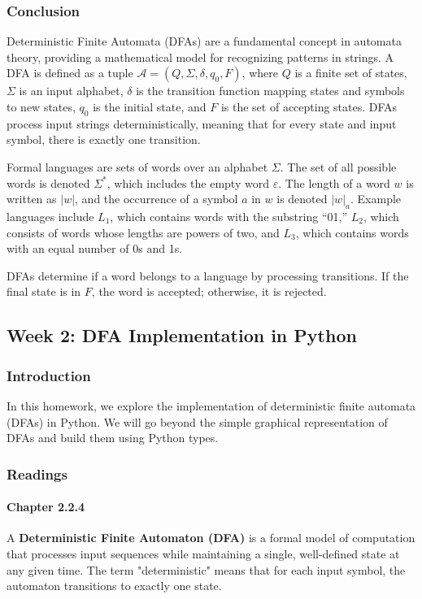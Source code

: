 \documentclass{article}
\theoremstyle{theorem}
\theoremstyle{definition}
\theoremstyle{remark}
\begin{document}
\subsubsection{Conclusion}

Deterministic Finite Automata (DFAs) are a fundamental concept in automata theory, providing a mathematical model for recognizing patterns in strings. A DFA is defined as a tuple \(\mathcal{A} = (Q, \Sigma, \delta, q_0, F)\), where \(Q\) is a finite set of states, \(\Sigma\) is an input alphabet, \(\delta\) is the transition function mapping states and symbols to new states, \(q_0\) is the initial state, and \(F\) is the set of accepting states. DFAs process input strings deterministically, meaning that for every state and input symbol, there is exactly one transition.

Formal languages are sets of words over an alphabet \(\Sigma\). The set of all possible words is denoted \(\Sigma^*\), which includes the empty word \(\varepsilon\). The length of a word \(w\) is written as \(|w|\), and the occurrence of a symbol \(a\) in \(w\) is denoted \(|w|_a\). Example languages include \(L_1\), which contains words with the substring “01,” \(L_2\), which consists of words whose lengths are powers of two, and \(L_3\), which contains words with an equal number of 0s and 1s.

DFAs determine if a word belongs to a language by processing transitions. If the final state is in \(F\), the word is accepted; otherwise, it is rejected.

\newpage

\subsection{Week 2: DFA Implementation in Python}

\subsubsection{Introduction}
In this homework, we explore the implementation of deterministic finite automata (DFAs) in Python. We will go beyond the simple graphical representation of DFAs and build them using Python types.

\subsubsection{Readings}
\paragraph*{Chapter 2.2.4}
A \textbf{Deterministic Finite Automaton (DFA)} is a formal model of computation that processes input sequences while maintaining a single, well-defined state at any given time. The term "deterministic" means that for each input symbol, the automaton transitions to exactly one state.
\end{document}
